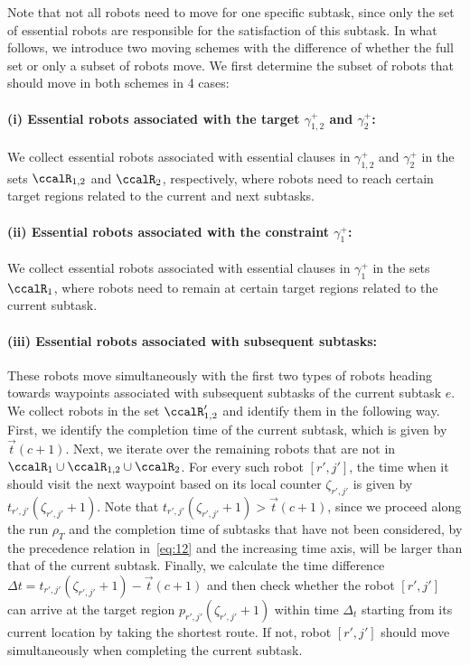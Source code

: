 \documentclass[Afour,sageh,times]{sagej}
\begin{document}
{Note that not all robots need to move for one specific subtask, since only the set of essential robots are responsible for the satisfaction of this subtask. In what follows, we introduce two moving schemes with the difference of whether the full set or only a subset of robots move.   We first determine the subset of robots that should move in both schemes in 4 cases:
\paragraph{(i) Essential robots associated with the target $\gamma_{1,2}^{+}$ and $\gamma_2^{+}$:}  We collect essential robots associated with essential clauses in $\gamma_{1,2}^{+}$ and $\gamma_2^{+}$ in the sets $\ccalR_{1,2}$ and $\ccalR_2$, respectively, where  robots need to reach certain target regions related to the current and next subtasks.
\paragraph{(ii) Essential robots associated with the constraint $\gamma_1^+$:} We collect essential robots associated with essential clauses in $\gamma_{1}^{+}$ in the sets $\ccalR_{1}$,  where robots need to remain at certain target regions related to the current subtask.
\paragraph{(iii) Essential robots associated with subsequent subtasks:} These robots move simultaneously with the first two types of robots heading towards  waypoints associated with subsequent subtasks of the current subtask $e$. We collect robots in the set $\ccalR'_{1,2}$ and identify them in the following way. First, we identify the completion time  of the current subtask, which is given by $\vec{t}(c+1)$.  Next, we iterate over the remaining robots that are not in $\ccalR_1 \cup \ccalR_{1,2} \cup \ccalR_2$. For every such robot $[r',j']$, the time when it should visit the next waypoint based on its local counter $\zeta_{r',j'}$ is given by $t_{r',j'}(\zeta_{r',j'}+1)$. Note that {$t_{r', j'}(\zeta_{r',j'}+1) > \vec{t}(c+1)$}, since we proceed along the run $\rho_T$ and the completion time of  subtasks that have not been considered, by the precedence relation in~\eqref{eq:12} and the increasing time axis, will be larger than that of the current subtask. Finally, we calculate the time difference $\Delta t = t_{r', j'}(\zeta_{r',j'}+1) - \vec{t}(c+1)$  and then check whether the robot $[r', j']$ can arrive at the target region $p_{r',j'}(\zeta_{r',j'}+1)$  within time $\Delta_t$ starting from  its current location by taking the shortest route. {If not, robot $[r', j']$ should move simultaneously when completing the current subtask.}
}
\end{document}
